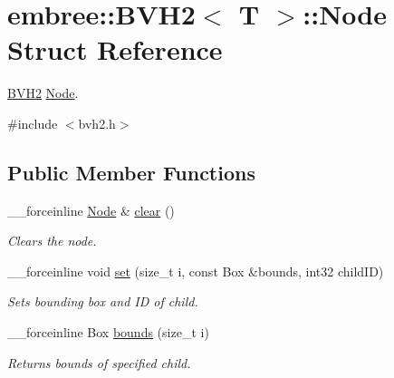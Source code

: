 \hypertarget{structembree_1_1_b_v_h2_1_1_node}{
\section{embree::BVH2$<$ T $>$::Node Struct Reference}
\label{structembree_1_1_b_v_h2_1_1_node}
}


\hyperlink{classembree_1_1_b_v_h2}{BVH2} \hyperlink{structembree_1_1_b_v_h2_1_1_node}{Node}.  




{\ttfamily \#include $<$bvh2.h$>$}

\subsection*{Public Member Functions}
\begin{DoxyCompactItemize}
\item 
\_\-\_\-forceinline \hyperlink{structembree_1_1_b_v_h2_1_1_node}{Node} \& \hyperlink{structembree_1_1_b_v_h2_1_1_node_a614f87897a52970e98ac6e65b6e8ca1e}{clear} ()
\begin{DoxyCompactList}\small\item\em Clears the node. \item\end{DoxyCompactList}\item 
\_\-\_\-forceinline void \hyperlink{structembree_1_1_b_v_h2_1_1_node_a2701f495156c62e058a2a376d76b6295}{set} (size\_\-t i, const Box \&bounds, int32 childID)
\begin{DoxyCompactList}\small\item\em Sets bounding box and ID of child. \item\end{DoxyCompactList}\item 
\_\-\_\-forceinline Box \hyperlink{structembree_1_1_b_v_h2_1_1_node_a897a528e3b0c989342eb30c35ccb161f}{bounds} (size\_\-t i)
\begin{DoxyCompactList}\small\item\em Returns bounds of specified child. \item\end{DoxyCompactList}\end{DoxyCompactItemize}
